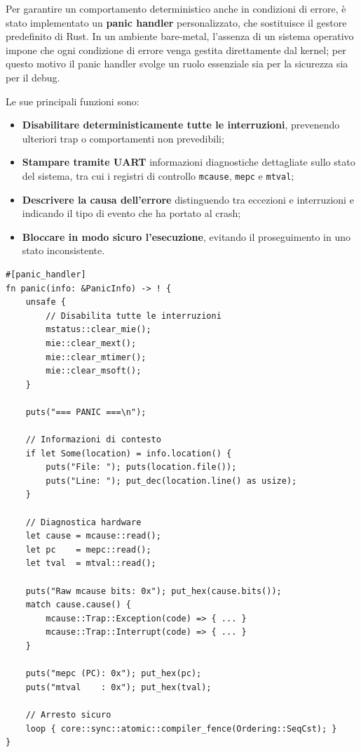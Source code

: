 \documentclass[italian, Lau, oneside]{sapthesis} %
\begin{document}
Per garantire un comportamento deterministico anche in condizioni di errore, è stato implementato un \textbf{panic handler} personalizzato, che sostituisce il gestore predefinito di Rust.  
In un ambiente bare-metal, l’assenza di un sistema operativo impone che ogni condizione di errore venga gestita direttamente dal kernel; per questo motivo il panic handler svolge un ruolo essenziale sia per la sicurezza sia per il debug.

Le sue principali funzioni sono:
\begin{itemize}
    \item \textbf{Disabilitare deterministicamente tutte le interruzioni}, prevenendo ulteriori trap o comportamenti non prevedibili;
    \item \textbf{Stampare tramite UART} informazioni diagnostiche dettagliate sullo stato del sistema, tra cui i registri di controllo \texttt{mcause}, \texttt{mepc} e \texttt{mtval};
    \item \textbf{Descrivere la causa dell’errore} distinguendo tra eccezioni e interruzioni e indicando il tipo di evento che ha portato al crash;
    \item \textbf{Bloccare in modo sicuro l’esecuzione}, evitando il proseguimento in uno stato inconsistente.
\end{itemize}

\begin{center}
\begin{verbatim}
#[panic_handler]
fn panic(info: &PanicInfo) -> ! {
    unsafe {
        // Disabilita tutte le interruzioni
        mstatus::clear_mie();
        mie::clear_mext();
        mie::clear_mtimer();
        mie::clear_msoft();
    }

    puts("=== PANIC ===\n");

    // Informazioni di contesto
    if let Some(location) = info.location() {
        puts("File: "); puts(location.file());
        puts("Line: "); put_dec(location.line() as usize);
    }

    // Diagnostica hardware
    let cause = mcause::read();
    let pc    = mepc::read();
    let tval  = mtval::read();

    puts("Raw mcause bits: 0x"); put_hex(cause.bits());
    match cause.cause() {
        mcause::Trap::Exception(code) => { ... }
        mcause::Trap::Interrupt(code) => { ... }
    }

    puts("mepc (PC): 0x"); put_hex(pc);
    puts("mtval    : 0x"); put_hex(tval);

    // Arresto sicuro
    loop { core::sync::atomic::compiler_fence(Ordering::SeqCst); }
}
\end{verbatim}
\end{center}
\end{document}

